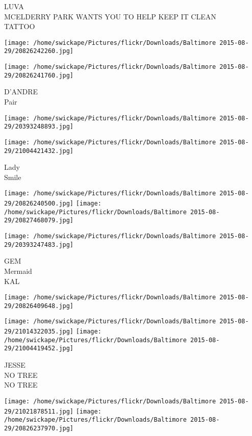 \documentclass[10pt,letterpaper]{article}
\begin{document}
LUVA\\
MCELDERRY PARK WANTS YOU TO HELP KEEP IT CLEAN\\
TATTOO\\
\pagebreak

\texttt{[image: /home/swickape/Pictures/flickr/Downloads/Baltimore 2015-08-29/20826242260.jpg]}

\vspace{0.25in}
\texttt{[image: /home/swickape/Pictures/flickr/Downloads/Baltimore 2015-08-29/20826241760.jpg]}

D'ANDRE\\
Pair\\
\pagebreak

\texttt{[image: /home/swickape/Pictures/flickr/Downloads/Baltimore 2015-08-29/20393248893.jpg]}

\vspace{0.25in}
\texttt{[image: /home/swickape/Pictures/flickr/Downloads/Baltimore 2015-08-29/21004421432.jpg]}

Lady\\
Smile\\
\pagebreak

\texttt{[image: /home/swickape/Pictures/flickr/Downloads/Baltimore 2015-08-29/20826240500.jpg]}
\texttt{[image: /home/swickape/Pictures/flickr/Downloads/Baltimore 2015-08-29/20827468079.jpg]}

\texttt{[image: /home/swickape/Pictures/flickr/Downloads/Baltimore 2015-08-29/20393247483.jpg]}

GEM\\
Mermaid\\
KAL\\
\pagebreak

\texttt{[image: /home/swickape/Pictures/flickr/Downloads/Baltimore 2015-08-29/20826409648.jpg]}

\vspace{0.25in}
\texttt{[image: /home/swickape/Pictures/flickr/Downloads/Baltimore 2015-08-29/21014322035.jpg]}
\texttt{[image: /home/swickape/Pictures/flickr/Downloads/Baltimore 2015-08-29/21004419452.jpg]}

JESSE\\
NO TREE\\
NO TREE\\
\pagebreak

\texttt{[image: /home/swickape/Pictures/flickr/Downloads/Baltimore 2015-08-29/21021878511.jpg]}
\texttt{[image: /home/swickape/Pictures/flickr/Downloads/Baltimore 2015-08-29/20826237970.jpg]}
\end{document}
